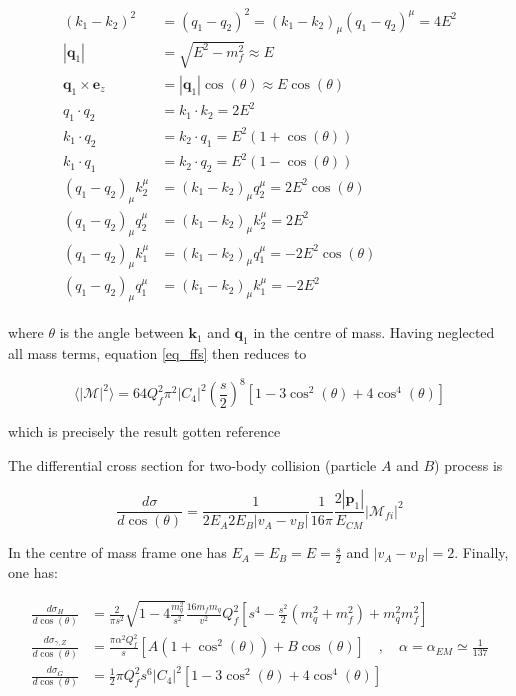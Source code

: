 \documentclass[11pt,a4paper]{article}
\begin{document}
\begin{align}
	\begin{split}
	(k_1-k_2)^2 &= (q_1 - q_2)^2 = (k_1-k_2)_\mu(q_1-q_2)^\mu = 4E^2\\
	|\bm{q}_1| &= \sqrt{E^2 - m_f^2} \approx E\\
	\bm{q}_1\times \bm{e}_z &= |\bm{q}_1|\cos(\theta) \approx E\cos(\theta)\\
	q_1\cdot q_2 &= k_1\cdot k_2 = 2E^2\\
	k_1\cdot q_2 &= k_2\cdot q_1 = E^2(1+\cos(\theta))\\
	k_1\cdot q_1 &= k_2\cdot q_2 = E^2(1-\cos(\theta))\\
	(q_1-q_2)_\mu k_2^\mu &= (k_1-k_2)_\mu q_2^\mu = 2E^2\cos(\theta)\\
	(q_1-q_2)_\mu q_2^\mu &= (k_1-k_2)_\mu k_2^\mu = 2E^2\\
	(q_1-q_2)_\mu k_1^\mu &= (k_1-k_2)_\mu q_1^\mu = -2E^2\cos(\theta)\\
	(q_1-q_2)_\mu q_1^\mu &= (k_1-k_2)_\mu k_1^\mu = -2E^2
	\end{split}
\end{align}

where $\theta$ is the angle between $\bm{k}_1$ and $\bm{q}_1$ in the centre of mass. Having neglected all mass terms, equation \ref{eq_ffs} then reduces to

\begin{equation}
	\langle|\mathcal{M}|^2\rangle = 64Q_f^2\pi^2|C_4|^2 \left(\frac{s}{2}\right)^8\left[1-3\cos^2(\theta) + 4\cos^4(\theta)\right]
\end{equation}

which is precisely the result gotten reference %

The differential cross section for two-body collision (particle $A$ and $B$) process is

\begin{equation}
	\frac{d\sigma}{d\cos(\theta)} = \frac{1}{2E_A2E_B|v_A-v_B|}\frac{1}{16\pi}\frac{2|\bm{p}_1|}{E_{CM}}|\mathcal{M}_{fi}|^2
\end{equation}

In the centre of mass frame one has $E_A=E_B=E=\frac{s}{2}$ and $|v_A-v_B| = 2$. Finally, one has:

\begin{align}
	\frac{d\sigma_{H}}{d\cos(\theta)} &= \frac{2}{\pi s^2} \sqrt{1-4\frac{m_q^2}{s^2}}\frac{16m_fm_q}{v^2}Q_f^2\left[ s^4 - \frac{s^2}{2}(m_q^2 + m_f^2) + m_q^2m_f^2\right]\\
	\frac{d\sigma_{\gamma,Z}}{d\cos(\theta)} &= \frac{\pi\alpha^2Q_f^2}{s}\left[A\left(1+\cos^2(\theta)\right) + B\cos(\theta)\right]\quad,\quad \alpha = \alpha_{EM} \simeq \frac{1}{137}\\
	\frac{d\sigma_{G}}{d\cos(\theta)} &= \frac{1}{2}\pi Q_f^2s^6|C_4|^2\left[1-3\cos^2(\theta) + 4\cos^4(\theta)\right]
\end{align}
\end{document}
